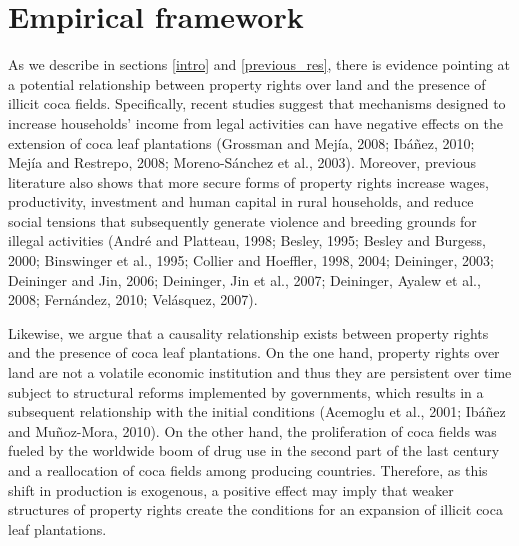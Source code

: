 \documentclass[12pt,a4paper,english]{article}%
\begin{document}
\section{Empirical framework}
\label{identification}

As we describe in sections \ref{intro} and \ref{previous_res}, there is  evidence pointing at a potential relationship between property rights over land and the presence of illicit coca fields. Specifically, recent studies suggest that mechanisms designed to increase households' income from legal activities can have negative effects on the extension of coca leaf plantations (Grossman and Mej\'{i}a, 2008; Ib\'{a}\~{n}ez, 2010; Mej\'{i}a and Restrepo, 2008; Moreno-S\'{a}nchez et al., 2003). Moreover, previous literature also shows that more secure forms of property rights increase wages, productivity, investment and human capital in rural households, and reduce social tensions that subsequently generate violence and breeding grounds for illegal activities (Andr\'{e} and Platteau, 1998; Besley, 1995; Besley and Burgess, 2000; Binswinger et al., 1995; Collier and Hoeffler, 1998, 2004; Deininger, 2003; Deininger and Jin, 2006; Deininger, Jin et al., 2007; Deininger, Ayalew et al., 2008; Fern\'{a}ndez, 2010; Vel\'{a}squez, 2007). 

Likewise, we argue that a causality relationship exists between property rights and the presence of coca leaf plantations. On the one hand, property rights over land are not a volatile economic institution and thus they are persistent over time subject to structural reforms implemented by governments, which results in a subsequent relationship with the initial conditions (Acemoglu et al., 2001; Ib\'{a}\~{n}ez and Mu\~{n}oz-Mora, 2010). On the other hand, the proliferation of coca fields was fueled by the worldwide boom of drug use in the second part of the last century and a reallocation of coca fields among producing countries. Therefore, as this shift in production is exogenous, a positive effect may imply that weaker structures of property rights create the conditions for an expansion of illicit coca leaf plantations.
\end{document}
